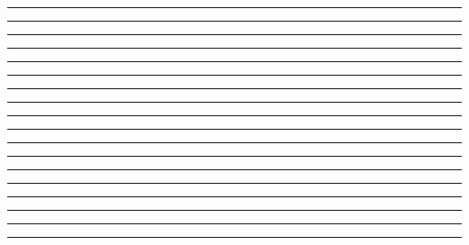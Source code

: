 \documentclass{article}
\begin{document}
\newpage
\noindent{}\rule{1cm}{0.025cm}\framebox{\rule{1cm}{1cm}}

\newpage
\noindent{}\rule{1cm}{0.025cm}

\newpage
\noindent{}\rule{1cm}{0.025cm}

\newpage
\noindent{}\rule{1cm}{0.025cm}

\newpage
\noindent{}\rule{1cm}{0.025cm}

\newpage
\noindent{}\rule{1cm}{0.025cm}

\newpage
\noindent{}\rule{1cm}{0.025cm}

\newpage
\noindent{}\rule{1cm}{0.025cm}

\newpage
\noindent{}\rule{1cm}{0.025cm}

\newpage
\noindent{}\rule{1cm}{0.025cm}

\newpage
\noindent{}\rule{1cm}{0.025cm}

\newpage
\noindent{}\rule{1cm}{0.025cm}

\newpage
\noindent{}\rule{1cm}{0.025cm}

\newpage
\noindent{}\rule{1cm}{0.025cm}

\newpage
\noindent{}\rule{1cm}{0.025cm}

\newpage
\noindent{}\rule{1cm}{0.025cm}

\newpage
\noindent{}\rule{1cm}{0.025cm}

\newpage
\noindent{}\rule{1cm}{0.025cm}
\end{document}
